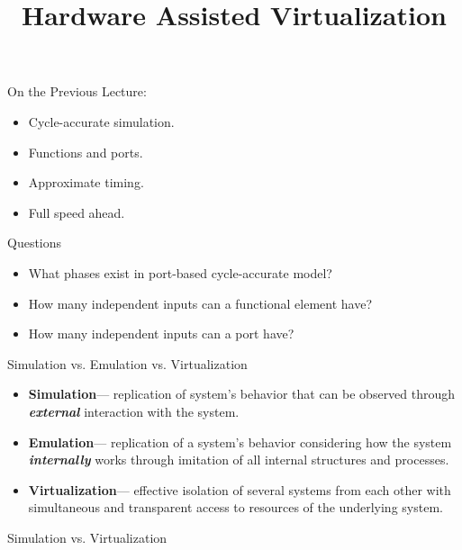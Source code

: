 
\title{Hardware Assisted Virtualization}




\startslides

\begin{frame}{On the Previous Lecture:}
  \begin{itemize}
    \item Cycle-accurate simulation.
    \item Functions and ports.
    \item Approximate timing.
    \item Full speed ahead.
  \end{itemize}
\end{frame}

\begin{frame}{Questions}
  \begin{itemize}
    \item What phases exist in port-based cycle-accurate model?\pause
    \item How many independent inputs can a functional element have?\pause
    \item How many independent inputs can a port have?
  \end{itemize}
\end{frame}

\begin{frame}{Simulation vs. Emulation vs. Virtualization}
\begin{itemize}
\item \textbf{Simulation}\pause --- replication of system's behavior that can
  be observed through \textbf{\textit{external}} interaction with the system.
\item \textbf{Emulation}\pause --- replication of a system's behavior
  considering how the system \textbf{\textit{internally}} works through
  imitation of all internal structures and processes.
\item \textbf{Virtualization}\pause --- effective isolation of several systems
  from each other with simultaneous and transparent access to resources of the
  underlying system.
\end{itemize}
\end{frame}

\begin{frame}{Simulation vs. Virtualization}
\centering
{}
\vfill
{}
\end{frame}

